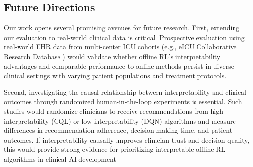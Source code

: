 \subsection{Future Directions}\label{sec:discussion:future}

Our work opens several promising avenues for future research. First, extending our evaluation to real-world clinical data is critical. Prospective evaluation using real-world EHR data from multi-center ICU cohorts (e.g., eICU Collaborative Research Database \citep{pollard2018eicu}) would validate whether offline RL's interpretability advantages and comparable performance to online methods persist in diverse clinical settings with varying patient populations and treatment protocols.

Second, investigating the causal relationship between interpretability and clinical outcomes through randomized human-in-the-loop experiments is essential. Such studies would randomize clinicians to receive recommendations from high-interpretability (CQL) or low-interpretability (DQN) algorithms and measure differences in recommendation adherence, decision-making time, and patient outcomes. If interpretability causally improves clinician trust and decision quality, this would provide strong evidence for prioritizing interpretable offline RL algorithms in clinical AI development.

